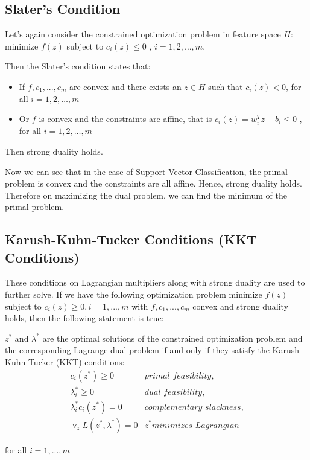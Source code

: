 \documentclass{article}
\begin{document}
\subsection{Slater's Condition}
Let's again consider the constrained optimization problem in feature space $H$: \\
minimize $f(z)$ subject to $c_i(z) \leq 0$ , $i = 1,2,…,m$. 

Then the Slater's condition \cite{slater} states that:
\begin{itemize}
    \item If $f, c_1,..., c_m$ are convex and there exists an $z \in H$ such that $c_i (z) < 0$, for all $i = 1,2,…,m$
    \item Or $f$ is convex and the constraints are affine, that is
$c_i(z) = w_i^T z + b_i \leq 0$ , for all $i = 1,2,…,m$
\end{itemize}
Then strong duality holds.

Now we can see that in the case of Support Vector Classification, the primal problem is convex and the constraints are all affine. Hence, strong duality holds. Therefore on maximizing the dual problem, we can find the minimum of the primal problem.

\subsection{Karush-Kuhn-Tucker Conditions (KKT Conditions)}
These conditions on Lagrangian multipliers along with strong duality are used to further solve. If we have the following optimization problem minimize $f(z)$ subject to $c_i(z) \geq 0 , i = 1,..., m$
with $f , c_1,..., c_m$ convex and strong duality holds, then the following statement is true:

$z^*$ and $\lambda^*$ are the optimal solutions of the constrained optimization problem and the corresponding Lagrange dual problem if and only if they satisfy the Karush-Kuhn-Tucker (KKT) conditions:
\begin{eqnarray}
c_i(z^*) \geq 0 & \textit{primal feasibility},\\
\lambda_i^* \geq 0 & \textit{dual feasibility},\\
\lambda_i^* c_i(z^*) = 0 & \textit{complementary slackness},\\
\triangledown_z L(z^*, \lambda^* ) = 0 & z^* \textit{minimizes Lagrangian}
\end{eqnarray}
\begin{center}
    for all $i = 1,..., m$
\end{center}
\end{document}
